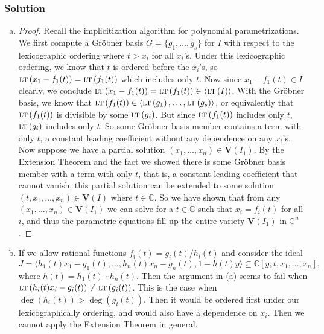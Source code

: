\documentclass{homework}
\newcommand{\id}[1]{\langle #1 \rangle}
\newcommand{\V}{\mathbf{V}}
\newcommand{\LT}[1]{\textsc{lt}\left(#1\right)}
\renewcommand{\deg}[1]{\operatorname{deg}(#1)}
\begin{document}
    \subsubsection{Solution}
    \begin{enumerate}[(a)]
        \item \begin{proof}
            Recall the implicitization algorithm for polynomial parametrizations. We first compute a Gr\"obner basis $G = \{g_1, \dots, g_s\}$ for $I$ with respect to the lexicographic ordering where $t > x_i$ for all $x_i$'s. Under this lexicographic ordering, we know that $t$ is ordered before the $x_i$'s, so $\LT{x_1 - f_1(t)} = \LT{f_1(t)}$ which includes only $t$. Now since $x_1 - f_1(t) \in I$ clearly, we conclude $\LT{x_1 - f_1(t)} = \LT{f_1(t)} \in \id{\LT{I}}$. With the Gr\"obner basis, we know that $\LT{f_1(t)} \in \id{\LT{g_1}, \dots, \LT{g_s}}$, or equivalently that $\LT{f_1(t)}$ is divisible by some $\LT{g_i}$. But since $\LT{f_1(t)}$ includes only $t$, $\LT{g_i}$ includes only $t$. So some Gr\"obner basis member contains a term with only $t$, a constant leading coefficient without any dependence on any $x_i$'s. \\
            
            Now suppose we have a partial solution $(x_1, \dots, x_n) \in \V(I_1)$. By the Extension Theorem and the fact we showed there is some Gr\"obner basis member with a term with only $t$, that is, a constant leading coefficient that cannot vanish, this partial solution can be extended to some solution $(t, x_1, \dots, x_n) \in \V(I)$ where $t \in \mathbb C$. So we have shown that from any $(x_1, \dots, x_n) \in \V(I_1)$ we can solve for a $t \in \mathbb C$ such that $x_i = f_i(t)$ for all $i$, and thus the parametric equations fill up the entire variety $\V(I_1)$ in $\mathbb C^n$.
        \end{proof}
        
        \item If we allow rational functions $f_i(t) = g_i(t)/h_i(t)$ and consider the ideal
        \[J = \id{h_1(t)x_1 - g_1(t), \dots, h_n(t)x_n - g_n(t), 1 - h(t)y} \subseteq \mathbb C[y, t, x_1, \dots, x_n],\]
        where $h(t) = h_1(t) \cdots h_n(t)$. Then the argument in (a) seems to fail when $\LT{h_i(t)x_i - g_i(t)} \neq \LT{g_i(t)}$. This is the case when $\deg{h_i(t)} > \deg{g_i(t)}$. Then it would be ordered first under our lexicographically ordering, and would also have a dependence on $x_i$. Then we cannot apply the Extension Theorem in general. \\
        

\end{enumerate}
\end{document}
